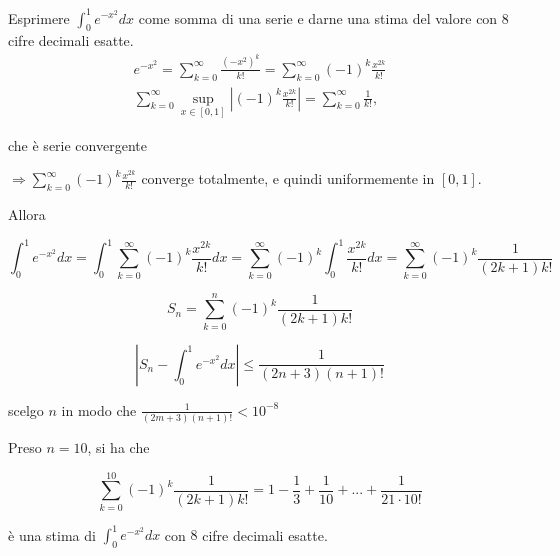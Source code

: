 \begin{exbar}
\begin{example}
	Esprimere $\int_{0}^{1}e^{-x^2}dx$ come somma di una serie e darne una stima del valore con $8$ cifre decimali esatte.
	\begin{gather*}
		e^{-x^2}=\sum_{k=0}^{\infty}\frac{(-x^2)^k}{k!}=\sum_{k=0}^{\infty}(-1)^k \frac{x^{2k}}{k!}
		\\
		\sum_{k=0}^{\infty}\sup_{x \in [0,1]}|(-1)^k \frac{x^{2k}}{k!}|=\sum_{k=0}^{\infty} \frac{1}{k!},
	\end{gather*}
		 
	che è serie convergente
	
	$\Rightarrow \sum_{k=0}^{\infty}(-1)^k \frac{x^{2k}}{k!}$ converge totalmente, e quindi uniformemente in $[0,1]$.
	
	Allora
	
	$$\int_{0}^{1}e^{-x^2}dx=\int_{0}^{1}\sum_{k=0}^{\infty}(-1)^k\frac{x^{2k}}{k!}dx=\sum_{k=0}^{\infty} (-1)^k \int_{0}^{1}\frac{x^{2k}}{k!}dx=\sum_{k=0}^{\infty}(-1)^k \frac{1}{(2k+1)k!}$$
	
	$$S_n=\sum_{k=0}^{n}(-1)^k \frac{1}{(2k+1)k!}$$
	
	$$\left|S_n-\int_{0}^{1}e^{-x^2}dx \right| \leq \frac{1}{(2n+3)(n+1)!}$$ 
	
	scelgo $n$ in modo che $\frac{1}{(2m+3)(n+1)!}<10^{-8}$
	
	Preso $n=10$, si ha che
	
	$$\sum_{k=0}^{10}(-1)^k\frac{1}{(2k+1)k!}=1-\frac{1}{3}+\frac{1}{10}+...+\frac{1}{21\cdot10!}$$ 
	
	è una stima di $\int_{0}^{1}e^{-x^2}dx$ con $8$ cifre decimali esatte.
\end{example}
\end{exbar}


